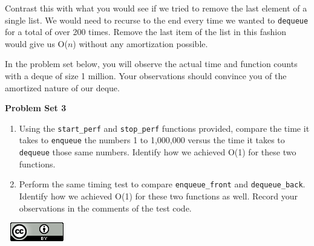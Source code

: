 \documentclass[
]{book}
\providecommand{\tightlist}{%
  \setlength{\itemsep}{0pt}\setlength{\parskip}{0pt}}
\begin{document}
Contrast this with what you would see if we tried to remove the last element of a single list. We would need to recurse to the end every time we wanted to \texttt{dequeue} for a total of over 200 times. Remove the last item of the list in this fashion would give us O(\(n\)) without any amortization possible.

In the problem set below, you will observe the actual time and function counts with a deque of size 1 million. Your observations should convince you of the amortized nature of our deque.

\begin{problembox}

\textbf{Problem Set 3}

\begin{enumerate}
\def\labelenumi{\arabic{enumi}.}
\tightlist
\item
  Using the \texttt{start\_perf} and \texttt{stop\_perf} functions provided, compare the time it takes to \texttt{enqueue} the numbers 1 to 1,000,000 versus the time it takes to \texttt{dequeue} those same numbers. Identify how we achieved O(1) for these two functions.\\
\item
  Perform the same timing test to compare \texttt{enqueue\_front} and \texttt{dequeue\_back}. Identify how we achieved O(1) for these two functions as well. Record your observations in the comments of the test code.
\end{enumerate}

\end{problembox}

\(\nonumber\)
\(\nonumber\)
\href{http://creativecommons.org/licenses/by/4.0/}{\includegraphics{images/cc-88x31.png}}

  
\end{document}
